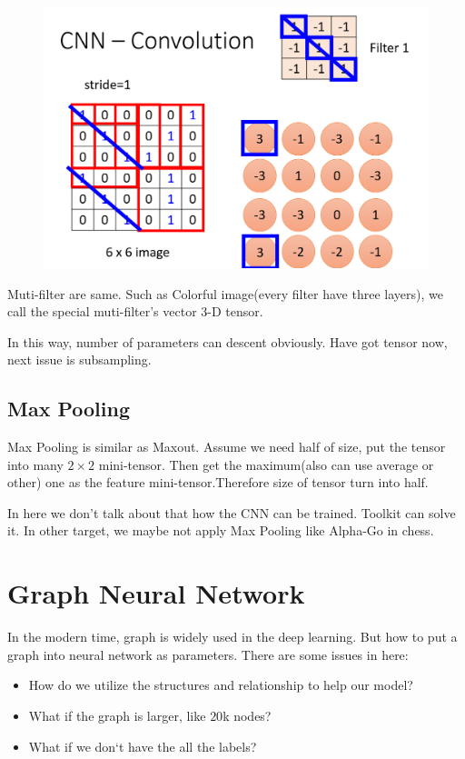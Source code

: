 \documentclass{article}
\begin{document}
\begin{figure}[htbp]
  \centering
  \includegraphics[scale=0.5]{pic/Property 2.png}
  \label{fig:my_label}
\end{figure}

Muti-filter are same. Such as Colorful image(every filter have three layers), we call the special muti-filter's vector 3-D tensor.

In this way, number of parameters can descent obviously. Have got tensor now, next issue is subsampling.

\subsection{Max Pooling}

Max Pooling is similar as Maxout. Assume we need half of size, put the tensor into many $2\times 2$ mini-tensor. Then get the maximum(also can use average or other) one as the feature mini-tensor.Therefore size of tensor turn into half.

In here we don't talk about that how the CNN can be trained. Toolkit can solve it. In other target, we maybe not apply Max Pooling like Alpha-Go in chess.

\section{Graph Neural Network}

In the modern time, graph is widely used in the deep learning. But how to put a graph into neural network as parameters. There are some issues in here:

\begin{itemize}
    \item How do we utilize the structures and relationship to help our model?
    \item What if the graph is larger, like $20$k nodes?
    \item What if we don‘t have the all the labels?
\end{itemize}
\end{document}
